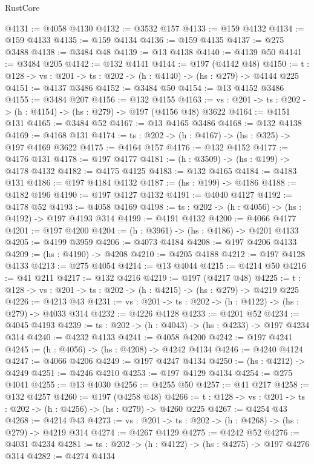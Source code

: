 \begin{lexlean}{RustCore}
\begin{coremodule}
@4131 := @4058 @4130
@4132 := @3532 @157
@4133 := @159 @4132
@4134 := @159 @4133
@4135 := @159 @4134
@4136 := @159 @4135
@4137 := @275 @3488
@4138 := @3484 @48
@4139 := @13 @4138
@4140 := @4139 @50
@4141 := @3484 @205
@4142 := @132 @4141
@4144 := @197 (@4142 @48)
@4150 := {t : @128} -> {vs : @201} -> {ts : @202} -> (h : @4140) -> (hs : @279) -> @4144 @225
@4151 := @4137 @3486
@4152 := @3484 @50
@4154 := @13 @4152 @3486
@4155 := @3484 @207
@4156 := @132 @4155
@4163 := {vs : @201} -> {ts : @202} -> (h : @4154) -> (hs : @279) -> @197 (@4156 @48) @3622
@4164 := @4151 @131
@4165 := @3484 @52
@4167 := @13 @4165 @3486
@4168 := @132 @4138
@4169 := @4168 @131
@4174 := {ts : @202} -> (h : @4167) -> (hs : @325) -> @197 @4169 @3622
@4175 := @4164 @157
@4176 := @132 @4152
@4177 := @4176 @131
@4178 := @197 @4177
@4181 := (h : @3509) -> (hs : @199) -> @4178 @4132
@4182 := @4175 @4125
@4183 := @132 @4165
@4184 := @4183 @131
@4186 := @197 @4184 @4132
@4187 := (hs : @199) -> @4186
@4188 := @4182 @196
@4190 := @197 @4127 @4132
@4191 := @4040 @4127
@4192 := @4178 @52
@4193 := @4058 @4169
@4198 := {ts : @202} -> (h : @4056) -> (hs : @4192) -> @197 @4193 @314
@4199 := @4191 @4132
@4200 := @4066 @4177
@4201 := @197 @4200
@4204 := (h : @3961) -> (hs : @4186) -> @4201 @4133
@4205 := @4199 @3959
@4206 := @4073 @4184
@4208 := @197 @4206 @4133
@4209 := (hs : @4190) -> @4208
@4210 := @4205 @4188
@4212 := @197 @4128 @4133
@4213 := @275 @4054
@4214 := @13 @4044
@4215 := @4214 @50
@4216 := @41 @211
@4217 := @132 @4216
@4219 := @197 (@4217 @48)
@4225 := {t : @128} -> {vs : @201} -> {ts : @202} -> (h : @4215) -> (hs : @279) -> @4219 @225
@4226 := @4213 @43
@4231 := {vs : @201} -> {ts : @202} -> (h : @4122) -> (hs : @279) -> @4033 @314
@4232 := @4226 @4128
@4233 := @4201 @52
@4234 := @4045 @4193
@4239 := {ts : @202} -> (h : @4043) -> (hs : @4233) -> @197 @4234 @314
@4240 := @4232 @4133
@4241 := @4058 @4200
@4242 := @197 @4241
@4245 := (h : @4056) -> (hs : @4208) -> @4242 @4134
@4246 := @4240 @4124
@4247 := @4066 @4206
@4249 := @197 @4247 @4134
@4250 := (hs : @4212) -> @4249
@4251 := @4246 @4210
@4253 := @197 @4129 @4134
@4254 := @275 @4041
@4255 := @13 @4030
@4256 := @4255 @50
@4257 := @41 @217
@4258 := @132 @4257
@4260 := @197 (@4258 @48)
@4266 := {t : @128} -> {vs : @201} -> {ts : @202} -> (h : @4256) -> (hs : @279) -> @4260 @225
@4267 := @4254 @43
@4268 := @4214 @43
@4273 := {vs : @201} -> {ts : @202} -> (h : @4268) -> (hs : @279) -> @4219 @314
@4274 := @4267 @4129
@4275 := @4242 @52
@4276 := @4031 @4234
@4281 := {ts : @202} -> (h : @4122) -> (hs : @4275) -> @197 @4276 @314
@4282 := @4274 @4134

\end{coremodule}
\end{lexlean}
